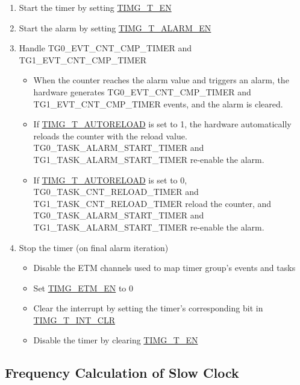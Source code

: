 \documentclass[main\_\_EN.tex]{subfiles}
\begin{document}
\begin{enumerate}
    \item Start the timer by setting \hyperref[fielddesc:TIMGTXEN]{TIMG\_T\_EN}
    \item Start the alarm by setting \hyperref[fielddesc:TIMGTXALARMEN]{TIMG\_T\_ALARM\_EN}
    \item Handle TG0\_EVT\_CNT\_CMP\_TIMER and TG1\_EVT\_CNT\_CMP\_TIMER
    \begin{itemize}
        \item When the counter reaches the alarm value and triggers an alarm, the hardware generates TG0\_EVT\_CNT\_CMP\_TIMER and TG1\_EVT\_CNT\_CMP\_TIMER events, and the alarm is cleared.
        \item If \hyperref[fielddesc:TIMGTXAUTORELOAD]{TIMG\_T\_AUTORELOAD} is set to 1, the hardware automatically reloads the counter with the reload value. TG0\_TASK\_ALARM\_START\_TIMER and TG1\_TASK\_ALARM\_START\_TIMER re-enable the alarm.
        \item If \hyperref[fielddesc:TIMGTXAUTORELOAD]{TIMG\_T\_AUTORELOAD} is set to 0, TG0\_TASK\_CNT\_RELOAD\_TIMER and TG1\_TASK\_CNT\_RELOAD\_TIMER reload the counter, and TG0\_TASK\_ALARM\_START\_TIMER and TG1\_TASK\_ALARM\_START\_TIMER re-enable the alarm.

    \end{itemize}
    \item Stop the timer (on final alarm iteration)
    \begin{itemize}
        \item Disable the ETM channels used to map timer group's events and tasks
        \item Set \hyperref[fielddesc:TIMGETMEN]{TIMG\_ETM\_EN} to 0
        \item Clear the interrupt by setting the timer's corresponding bit in \hyperref[fielddesc:TIMGTXINTCLR]{TIMG\_T\_INT\_CLR}
        \item Disable the timer by clearing \hyperref[fielddesc:TIMGTXEN]{TIMG\_T\_EN}
    \end{itemize}
\end{enumerate}

\subsection{Frequency Calculation of Slow Clock}
\label{sec:rtc-calibration-procedure}
\end{document}
